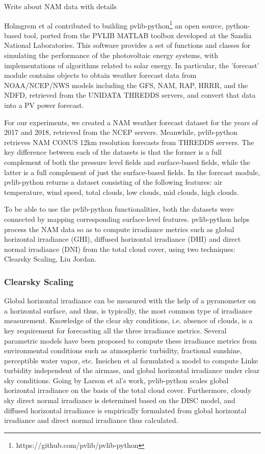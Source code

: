 \par Write about NAM data with details

Holmgrem et al \cite{pvlib_Holmgren2018} contributed to building pvlib-python\footnote{https://github.com/pvlib/pvlib-python} an open source, python-based tool, ported from the PVLIB MATLAB toolbox developed at the Sandia National Laboratories. This software provides a set of functions and classes for simulating the performance of the photovoltaic energy systems, with implementations of algorithms related to solar energy. In particular, the 'forecast' module contains objects to obtain weather forecast data from NOAA/NCEP/NWS models including the GFS, NAM, RAP, HRRR, and the NDFD, retrieved from the UNIDATA THREDDS servers, and convert that data into a PV power forecast. 

\par For our experiments, we created a NAM weather forecast dataset for the years of 2017 and 2018, retrieved from the NCEP servers. Meanwhile, pvlib-python retrieves NAM CONUS 12km resolution forecasts from THREDDS servers. The key difference between each of the datasets is that the former is a full complement of both the pressure level fields and surface-based fields, while the latter is a full complement of just the surface-based fields. In the forecast module, pvlib-python returns a dataset consisting of the following features: air temperature, wind speed, total clouds, low clouds, mid clouds, high clouds. 

\par To be able to use the pvlib-python functionalities, both the datasets were connected by mapping corresponding surface-level features. pvlib-python helps process the NAM data so as to compute irradiance metrics such as global horizontal irradiance (GHI), diffused horizontal irradiance (DHI) and direct normal irradiance (DNI) from the total cloud cover, using two techniques: Clearsky Scaling, Liu Jordan.


\subsubsection*{Clearsky Scaling}
Global horizontal irradiance can be measured with the help of a pyranometer on a horizontal surface, and thus, is typically, the most common type of irradiance measurement. Knowledge of the clear sky conditions, i.e. absence of clouds, is a key requirement for forecasting all the three irradiance metrics. Several parametric models have been proposed to compute these irradiance metrics from environmental conditions such as atmospheric turbidity, fractional sunshine, perceptible water vapor, etc. Ineichen et al \cite{pvlib_ineichen} formulated a model to compute Linke turbidity independent of the airmass, and global horizontal irradiance under clear sky conditions. Going by Larson et al's \cite{pvlib_larson} work, pvlib-python scales global horizontal irradiance on the basis of the total cloud cover. Furthermore, cloudy sky direct normal irradiance is determined based on the DISC \cite{pvlib_disc} model, and diffused horizontal irradiance is empirically formulated from global horizontal irradiance and direct normal irradiance thus calculated.

